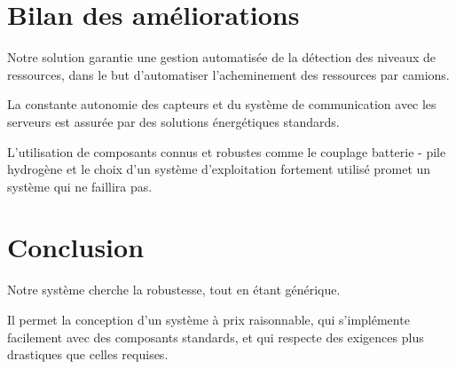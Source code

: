 \section{Bilan des améliorations}

Notre solution garantie une gestion automatisée de la détection des niveaux de ressources, dans le but d’automatiser l’acheminement des ressources par camions.

La constante autonomie des capteurs et du système de communication avec les serveurs est assurée par des solutions énergétiques standards.

L’utilisation de composants connus et robustes comme le couplage batterie - pile hydrogène et le choix d’un système d’exploitation fortement utilisé promet un système qui ne faillira pas.

\section{Conclusion}

Notre système cherche la robustesse, tout en étant générique.

Il permet la conception d’un système à prix raisonnable, qui s’implémente facilement avec des composants standards, et qui respecte des exigences plus drastiques que celles requises.